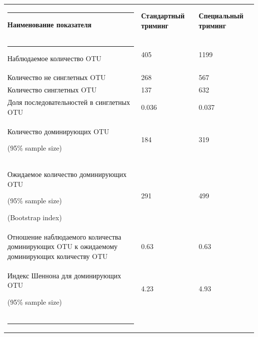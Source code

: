 \documentclass[a4paper,12pt,openany,final]{extreport}
\makeatletter
\def\vhrulefill#1{\leavevmode\leaders\hrule\@height#1\hfill \kern\z@}
\newcommand\toprule{\noindent\vhrulefill{2pt}}
\newcommand\bottomrule{\noindent\vhrulefill{2pt}}
\newcommand\midrule{\noindent\vhrulefill{2pt}}
\def\oldcaption{} \let\oldcaption=\caption
\def\caption{\stepcounter{captionsnum}\oldcaption}
\makeatother
\begin{document}
\begin{table}
  \centering
\caption{Показатели разнообразия таксономического состава сообществ
при метогеномном анализе, основанном на выделении OTU.}\label{table:3-1}

\begin{longtable}[]{@{}lll@{}}
\toprule
\textbf{Наименование показателя} & \textbf{Стандартный триминг} &
\textbf{Специальный триминг}\tabularnewline
\midrule
\endhead
Наблюдаемое количество OTU & 405 & 1199\tabularnewline
Количество не синглетных OTU & 268 & 567\tabularnewline
Количество синглетных OTU & 137 & 632\tabularnewline
Доля последовательностей в синглетных OTU & 0.036 & 0.037\tabularnewline
\begin{minipage}[t]{0.32\columnwidth}\raggedright
Количество доминирующих OTU

(95\% sample size)\strut
\end{minipage} & \begin{minipage}[t]{0.32\columnwidth}\raggedright
184\strut
\end{minipage} & \begin{minipage}[t]{0.32\columnwidth}\raggedright
319\strut
\end{minipage}\tabularnewline
\begin{minipage}[t]{0.32\columnwidth}\raggedright
Ожидаемое количество доминирующих OTU

(95\% sample size)

(Bootstrap index)\strut
\end{minipage} & \begin{minipage}[t]{0.32\columnwidth}\raggedright
291\strut
\end{minipage} & \begin{minipage}[t]{0.32\columnwidth}\raggedright
499\strut
\end{minipage}\tabularnewline
Отношение наблюдаемого количества доминирующих OTU к ожидаемому
доминирующих количеству OTU & 0.63 & 0.63\tabularnewline
\begin{minipage}[t]{0.32\columnwidth}\raggedright
Индекс Шеннона для доминирующих OTU

(95\% sample size)\strut
\end{minipage} & \begin{minipage}[t]{0.32\columnwidth}\raggedright
4.23\strut
\end{minipage} & \begin{minipage}[t]{0.32\columnwidth}\raggedright
4.93\strut
\end{minipage}\tabularnewline
\bottomrule
\end{longtable}
\end{table}
\end{document}
